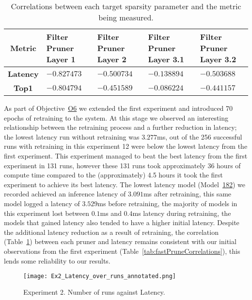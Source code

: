 \documentclass[../Dissertation.tex]{subfiles}
\begin{document}
\singlespacing
\begin{table}[H]
    \centering
    \begin{tabular}{@{}cp{26mm}p{26mm}p{26mm}p{26mm}@{}}
    \toprule
    \textbf{Metric}  & \textbf{Filter Pruner  Layer 1} & \textbf{Filter Pruner Layer 2} & \textbf{Filter Pruner Layer 3.1} & \textbf{Filter Pruner Layer 3.2} \\ \midrule
    \textbf{Latency} & $-0.827473$                        & $-0.500734$                      & $-0.138894$                         & $-0.503688$                         \\
    \textbf{Top1}    & $-0.804794$                        & $-0.451589$                      & $-0.086224$                        & $-0.441157$                        \\ \bottomrule
    \end{tabular}
    \caption{Correlations between each target sparsity parameter and the metric being measured.}
    \label{tab:Ex2PruneCorrelations}
\end{table}
\doublespacing

As part of Objective~\hyperref[obj:AutoParams]{O6} we extended the first experiment and introduced 70 epochs of retraining to the system. 
At this stage we observed an interesting relationship between the retraining process and a further reduction in latency; the lowest latency run without retraining was $3.277$ms, out of the 256 successful runs with retraining in this experiment 12 were below the lowest latency from the first experiment.
This experiment managed to beat the best latency from the first experiment in 131 runs, however these 131 runs took approximately 36 hours of compute time compared to the (approximately) 4.5 hours it took the first experiment to achieve its best latency.
The lowest latency model (Model~\hyperref[sec:sec:unique-sweep-182]{182}) we recorded achieved an inference latency of $3.091$ms after retraining, this same model logged a latency of $3.529$ms before retraining, the majority of models in this experiment lost between $0.1$ms and $0.4$ms latency during retraining, the models that gained latency also tended to have a higher initial latency.
Despite the additional latency reduction as a result of retraining, the correlation (Table~\ref{tab:Ex2PruneCorrelations}) between each pruner and latency remains consistent with our initial observations from the first experiment (Table~\ref{tab:fastPruneCorrelations}), this lends some reliability to our results.


\begin{figure}[H]
    \centering
    \texttt{[image: Ex2\_Latency\_over\_runs\_annotated.png]}
    \caption{Experiment 2. Number of runs against Latency.}
\end{figure}
\end{document}
